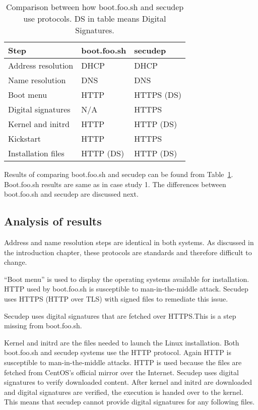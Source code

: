 \begin{table}[!ht]
  \def\arraystretch{1.1}%
  \begin{center}
    \caption{Comparison between how boot.foo.sh and secudep use
      protocols. DS in table means Digital
      Signatures.\label{tab:comparison_table}}
    \begin{tabular}{| l | l | l |}
      \hline
      Step               & boot.foo.sh   & secudep    \\
      \hline
      Address resolution & DHCP          & DHCP       \\
      Name resolution    & DNS           & DNS        \\
      Boot menu          & HTTP          & HTTPS (DS) \\
      Digital signatures & N/A           & HTTPS      \\
      Kernel and initrd  & HTTP          & HTTP (DS)  \\
      Kickstart          & HTTP          & HTTPS      \\
      Installation files & HTTP (DS)     & HTTP (DS)  \\
      \hline
    \end{tabular}
  \end{center}
\end{table}

Results of comparing boot.foo.sh and secudep can be found from
Table~\ref{tab:comparison_table}. Boot.foo.sh results are same as in
case study 1. The differences between boot.foo.sh and secudep are
discussed next.


\subsection{Analysis of results}

Address and name resolution steps are identical in both systems. As
discussed in the introduction chapter, these protocols are standards
and therefore difficult to change.

``Boot menu'' is used to display the operating systems available for
installation. HTTP used by boot.foo.sh is susceptible to
man-in-the-middle attack. Secudep uses HTTPS (HTTP over TLS) with
signed files to remediate this issue.

Secudep uses digital signatures that are fetched over HTTPS.\@ This is
a step missing from boot.foo.sh.

Kernel and initrd are the files needed to launch the Linux
installation. Both boot.foo.sh and secudep systems use the HTTP
protocol. Again HTTP is susceptible to man-in-the-middle attacks. HTTP
is used because the files are fetched from CentOS's official mirror
over the Internet. Secudep uses digital signatures to verify
downloaded content. After kernel and initrd are downloaded and digital
signatures are verified, the execution is handed over to the
kernel. This means that secudep cannot provide digital signatures for
any following files.


